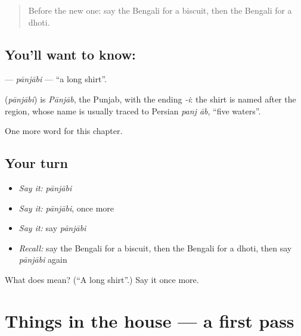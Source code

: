 \label{lesson:BN-C119-panjabi}



\begin{quote}
Before the new one: say the Bengali for a biscuit, then the Bengali for a dhoti.
\end{quote}

\subsection*{You'll want to know: }
\textbf{} — \emph{pānjābi} — \textquotedblleft{}a long shirt\textquotedblright{}.

\begin{cousinweb}
\textbf{} (\emph{pānjābi}) is \emph{Pānjāb}, the Punjab, with the ending \emph{-i}: the shirt is named after the region, whose name is usually traced to Persian \emph{panj āb}, \textquotedblleft{}five waters\textquotedblright{}.
\end{cousinweb}

\begin{grammarlens}[title={What you've built}]
One more word for this chapter.
\end{grammarlens}

\subsection*{Your turn}
\begin{itemize}
\raggedright
  \item \emph{Say it:} \emph{pānjābi}
  \item \emph{Say it:} \emph{pānjābi}, once more
  \item \emph{Say it:} say \emph{pānjābi}
  \item \emph{Recall:} say the Bengali for a biscuit, then the Bengali for a dhoti, then say \emph{pānjābi} again
\end{itemize}

\begin{tcolorbox}[breakable,colback=teal!4,colframe=teal!35!black,title={Before you move on}]
What does  mean? (\textquotedblleft{}A long shirt\textquotedblright{}.) Say it once more.
\end{tcolorbox}
\section[(dialogue)]{Things in the house — a first pass}

